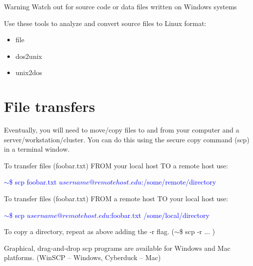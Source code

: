 \documentclass{beamer}[10pt, usepdftitle=false, handout]
\newcommand*{\blue}{\textcolor{blue}}
\begin{document}
	\begin{frame}

	\begin{alertblock}{Warning}
	Watch out for source code or data files written on Windows systems
	\end{alertblock}
		
	\vspace*{1em}
	Use these tools to analyze and convert source files to Linux format:
	\vspace*{1em}
	
	\begin{itemize}
		\item{file}
		\item{dos2unix}
		\item{unix2dos}
	\end{itemize}
	
	\end{frame}
	
	\section{File transfers}
	
	\begin{frame}
	
	Eventually, you will need to move/copy files to and from your computer and a server/workstation/cluster. You can do this using the secure copy command (scp) in a terminal window.
	\vspace*{1em}	
	
	To transfer files (foobar.txt) FROM your local host TO a remote host use:
	\vspace*{0.5em}

	\blue{$\sim$\$ scp foobar.txt $username@remotehost.edu$:/some/remote/directory} 
	\vspace*{0.5em}	
	
	To transfer files (foobar.txt) FROM a remote host TO your local host use:
	\vspace*{0.5em}	
	
	\blue{$\sim$\$ scp $username@remotehost.edu$:foobar.txt /some/local/directory}
	\vspace*{0.5em}	
	
	To copy a directory, repeat as above adding the ‐r flag. ($\sim$\$ scp ‐r ... )
	\vspace*{0.5em}

	Graphical, drag‐and‐drop scp programs are available for Windows and Mac platforms.
	(WinSCP – Windows, Cyberduck – Mac)
	
	\end{frame}		
			
\end{document}
